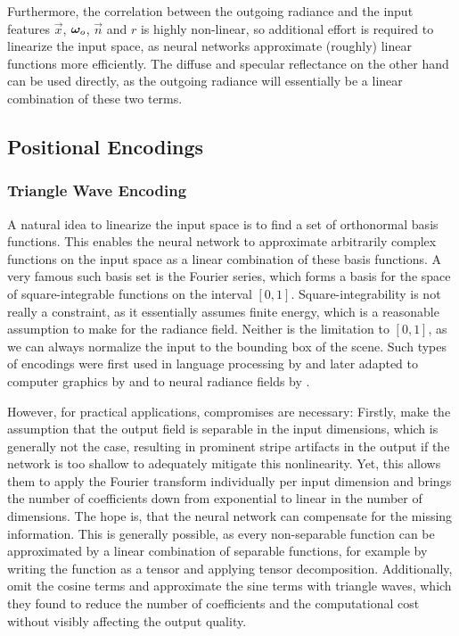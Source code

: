 Furthermore, the correlation between the outgoing radiance and the input features $\vec{x}$, ${\bm{\omega}_o}$, $\vec{n}$ and $r$ is highly non-linear, so additional effort is required to linearize the input space, as neural networks approximate (roughly) linear functions more efficiently.
The diffuse and specular reflectance on the other hand can be used directly, as the outgoing radiance will essentially be a linear combination of these two terms.

\subsection{Positional Encodings}

\subsubsection{Triangle Wave Encoding}
A natural idea to linearize the input space is to find a set of orthonormal basis functions.
This enables the neural network to approximate arbitrarily complex functions on the input space as a linear combination of these basis functions.
A very famous such basis set is the Fourier series, which forms a basis for the space of square-integrable functions on the interval $[0, 1]$.
Square-integrability is not really a constraint, as it essentially assumes finite energy, which is a reasonable assumption to make for the radiance field.
Neither is the limitation to $[0, 1]$, as we can always normalize the input to the bounding box of the scene.
Such types of encodings were first used in language processing by \textcite{vaswani2017} and later adapted to computer graphics by \textcite{tancik2020} and to neural radiance fields by \textcite{mildenhall2020}.

However, for practical applications, compromises are necessary:
Firstly, \textcite{tancik2020} make the assumption that the output field is separable in the input dimensions, which is generally not the case, resulting in prominent stripe artifacts in the output if the network is too shallow to adequately mitigate this nonlinearity.
Yet, this allows them to apply the Fourier transform individually per input dimension and brings the number of coefficients down from exponential to linear in the number of dimensions.
The hope is, that the neural network can compensate for the missing information.
This is generally possible, as every non-separable function can be approximated by a linear combination of separable functions, for example by writing the function as a tensor and applying tensor decomposition.
Additionally, \textcite{muller2021} omit the cosine terms and approximate the sine terms with triangle waves, which they found to reduce the number of coefficients and the computational cost without visibly affecting the output quality.

